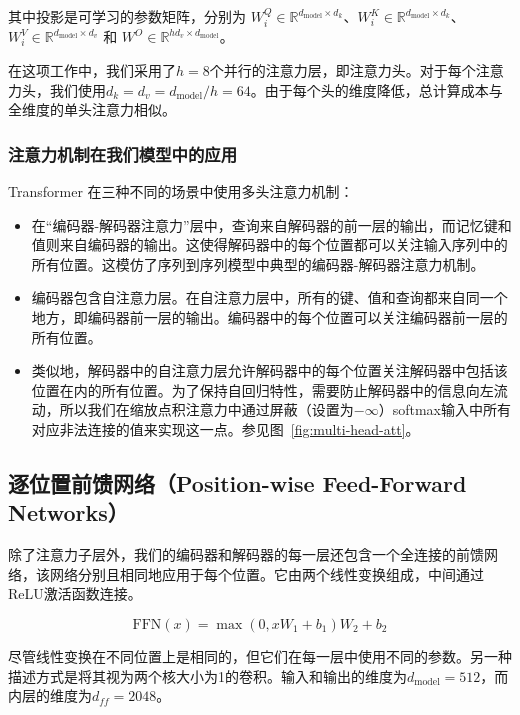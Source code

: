 \documentclass[lang=cn,a4paper,newtx]{elegantpaper}
\newcommand{\dmodel}{d_{\text{model}}}
\begin{document}
其中投影是可学习的参数矩阵，分别为 $W^Q_i \in \mathbb{R}^{\dmodel \times d_k}$、$W^K_i \in \mathbb{R}^{\dmodel \times d_k}$、$W^V_i \in \mathbb{R}^{\dmodel \times d_v}$ 和 $W^O \in \mathbb{R}^{hd_v \times \dmodel}$。

在这项工作中，我们采用了$h=8$个并行的注意力层，即注意力头。对于每个注意力头，我们使用$d_k=d_v=\dmodel/h=64$。由于每个头的维度降低，总计算成本与全维度的单头注意力相似。

\subsubsection{注意力机制在我们模型中的应用}

Transformer 在三种不同的场景中使用多头注意力机制：

\begin{itemize}
 \item 在“编码器-解码器注意力”层中，查询来自解码器的前一层的输出，而记忆键和值则来自编码器的输出。这使得解码器中的每个位置都可以关注输入序列中的所有位置。这模仿了序列到序列模型中典型的编码器-解码器注意力机制。

 \item 编码器包含自注意力层。在自注意力层中，所有的键、值和查询都来自同一个地方，即编码器前一层的输出。编码器中的每个位置可以关注编码器前一层的所有位置。

 \item 类似地，解码器中的自注意力层允许解码器中的每个位置关注解码器中包括该位置在内的所有位置。为了保持自回归特性，需要防止解码器中的信息向左流动，所以我们在缩放点积注意力中通过屏蔽（设置为$-\infty$）softmax输入中所有对应非法连接的值来实现这一点。参见图~\ref{fig:multi-head-att}。

\end{itemize}

\subsection{逐位置前馈网络（Position-wise Feed-Forward Networks）}\label{sec:ffn}

除了注意力子层外，我们的编码器和解码器的每一层还包含一个全连接的前馈网络，该网络分别且相同地应用于每个位置。它由两个线性变换组成，中间通过ReLU激活函数连接。

\begin{equation}
  \mathrm{FFN}(x)=\max(0, xW_1 + b_1) W_2 + b_2
\end{equation}

尽管线性变换在不同位置上是相同的，但它们在每一层中使用不同的参数。另一种描述方式是将其视为两个核大小为1的卷积。输入和输出的维度为$\dmodel=512$，而内层的维度为$d_{ff}=2048$。
\end{document}
